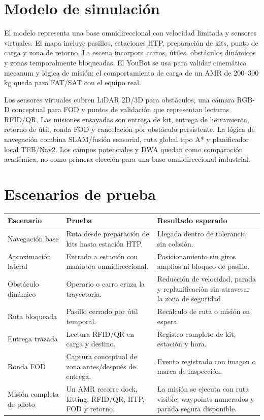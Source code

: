 \section{Modelo de simulación}

El modelo representa una base omnidireccional con velocidad limitada y sensores virtuales. El mapa incluye pasillos, estaciones HTP, preparación de kits, punto de carga y zona de retorno. La escena incorpora carros, útiles, obstáculos dinámicos y zonas temporalmente bloqueadas. El YouBot se usa para validar cinemática mecanum y lógica de misión; el comportamiento de carga de un AMR de 200--300 kg queda para FAT/SAT con el equipo real.

Los sensores virtuales cubren LiDAR 2D/3D para obstáculos, una cámara RGB-D conceptual para FOD y puntos de validación que representan lecturas RFID/QR. Las misiones ensayadas son entrega de kit, entrega de herramienta, retorno de útil, ronda FOD y cancelación por obstáculo persistente. La lógica de navegación combina SLAM/fusión sensorial, ruta global tipo A* y planificador local TEB/Nav2. Los campos potenciales y DWA quedan como comparación académica, no como primera elección para una base omnidireccional industrial.

\section{Escenarios de prueba}

\begin{longtable}{P{0.25\textwidth}P{0.39\textwidth}P{0.26\textwidth}}
\toprule
Escenario & Prueba & Resultado esperado\\
\midrule
\endhead
Navegación base & Ruta desde preparación de kits hasta estación HTP. & Llegada dentro de tolerancia sin colisión.\\
Aproximación lateral & Entrada a estación con maniobra omnidireccional. & Posicionamiento sin giros amplios ni bloqueo de pasillo.\\
Obstáculo dinámico & Operario o carro cruza la trayectoria. & Reducción de velocidad, parada y replanificación sin atravesar la zona de seguridad.\\
Ruta bloqueada & Pasillo cerrado por útil temporal. & Recálculo de ruta o misión en espera.\\
Entrega trazada & Lectura RFID/QR en carga y destino. & Registro completo de kit, estación y hora.\\
Ronda FOD & Captura conceptual de zona antes/después de entrega. & Evento registrado con imagen o marca de inspección.\\
Misión completa de piloto & Un AMR recorre dock, kitting, RFID/QR, HTP, FOD y retorno. & La misión se ejecuta con ruta visible, waypoints numerados y parada segura disponible.\\
\bottomrule
\end{longtable}

